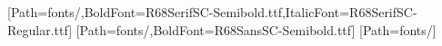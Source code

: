 \usepackage{xeCJK}
[Path=fonts/,BoldFont=R68SerifSC-Semibold.ttf,ItalicFont=R68SerifSC-Regular.ttf]
[Path=fonts/,BoldFont=R68SansSC-Semibold.ttf]
[Path=fonts/]
\renewcommand{\abstractname}{摘要}
